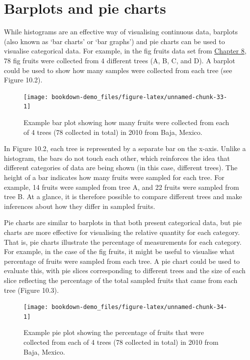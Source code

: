 \documentclass[
  openany]{scrbook}
\begin{document}
\hypertarget{barplots-and-pie-charts}{%
\section{Barplots and pie charts}\label{barplots-and-pie-charts}}

While histograms are an effective way of visualising continuous data, barplots (also known as `bar charts' or `bar graphs') and pie charts can be used to visualise categorical data.
For example, in the fig fruits data set from \protect\hyperlink{Chapter_8}{Chapter 8}, 78 fig fruits were collected from 4 different trees (A, B, C, and D).
A barplot could be used to show how many samples were collected from each tree (see Figure 10.2).

\begin{figure}
\texttt{[image: bookdown-demo\_files/figure-latex/unnamed-chunk-33-1]} \caption{Example bar plot showing how many fruits were collected from each of 4 trees (78 collected in total) in 2010 from Baja, Mexico.}\label{fig:unnamed-chunk-33}
\end{figure}

In Figure 10.2, each tree is represented by a separate bar on the x-axis.
Unlike a histogram, the bars do not touch each other, which reinforces the idea that different categories of data are being shown (in this case, different trees).
The height of a bar indicates how many fruits were sampled for each tree.
For example, 14 fruits were sampled from tree A, and 22 fruits were sampled from tree B.
At a glance, it is therefore possible to compare different trees and make inferences about how they differ in sampled fruits.

Pie charts are similar to barplots in that both present categorical data, but pie charts are more effective for visualising the relative quantity for each category.
That is, pie charts illustrate the percentage of measurements for each category.
For example, in the case of the fig fruits, it might be useful to visualise what percentage of fruits were sampled from each tree.
A pie chart could be used to evaluate this, with pie slices corresponding to different trees and the size of each slice reflecting the percentage of the total sampled fruits that came from each tree (Figure 10.3).

\begin{figure}
\texttt{[image: bookdown-demo\_files/figure-latex/unnamed-chunk-34-1]} \caption{Example pie plot showing the percentage of fruits that were collected from each of 4 trees (78 collected in total) in 2010 from Baja, Mexico.}\label{fig:unnamed-chunk-34}
\end{figure}
\end{document}
